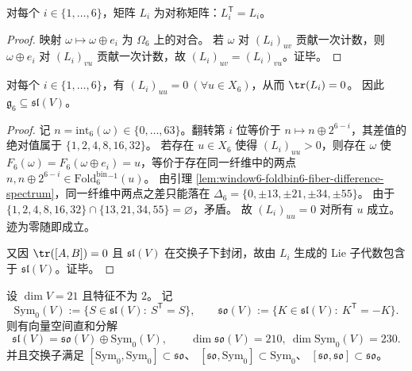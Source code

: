 \begin{lemma}[对称性]\label{lem:window6-li-symmetric}
对每个 \(i\in\{1,\dots,6\}\)，矩阵 \(L_i\) 为对称矩阵：\(L_i^{\mathsf T}=L_i\)。
\end{lemma}
\begin{proof}
映射 \(\omega\mapsto \omega\oplus e_i\) 为 \(\Omega_6\) 上的对合。
若 \(\omega\) 对 \((L_i)_{uv}\) 贡献一次计数，则 \(\omega\oplus e_i\) 对 \((L_i)_{vu}\) 贡献一次计数，故 \((L_i)_{uv}=(L_i)_{vu}\)。证毕。
\end{proof}

\begin{lemma}[零对角与迹零]\label{lem:window6-li-traceless}
对每个 \(i\in\{1,\dots,6\}\)，有 \((L_i)_{uu}=0\ (\forall u\in X_6)\)，从而 \(\tr(L_i)=0\)。
因此 \(\mathfrak{g}_6\subseteq \mathfrak{sl}(V)\)。
\end{lemma}
\begin{proof}
记 \(n=\mathrm{int}_6(\omega)\in\{0,\dots,63\}\)。翻转第 \(i\) 位等价于 \(n\mapsto n\oplus 2^{6-i}\)，其差值的绝对值属于 \(\{1,2,4,8,16,32\}\)。
若存在 \(u\in X_6\) 使得 \((L_i)_{uu}>0\)，则存在 \(\omega\) 使 \(F_6(\omega)=F_6(\omega\oplus e_i)=u\)，等价于存在同一纤维中的两点 \(n,n\oplus 2^{6-i}\in \mathrm{Fold}^{\mathrm{bin}}_6{}^{-1}(u)\)。
由引理 \ref{lem:window6-foldbin6-fiber-difference-spectrum}，同一纤维中两点之差只能落在 \(\Delta_6=\{0,\pm 13,\pm 21,\pm 34,\pm 55\}\)。
由于 \(\{1,2,4,8,16,32\}\cap\{13,21,34,55\}=\varnothing\)，矛盾。
故 \((L_i)_{uu}=0\) 对所有 \(u\) 成立。
迹为零随即成立。\par
又因 \(\tr([A,B])=0\) 且 \(\mathfrak{sl}(V)\) 在交换子下封闭，故由 \(L_i\) 生成的 Lie 子代数包含于 \(\mathfrak{sl}(V)\)。证毕。
\end{proof}

\begin{remark}[对称/反对称分解与交换子闭合]\label{rem:window6-sl-decomposition-so-sym0}
设 \(\dim V=21\) 且特征不为 \(2\)。
记
\[
\mathrm{Sym}_0(V):=\{S\in\mathfrak{sl}(V):\ S^{\mathsf T}=S\},
\qquad
\mathfrak{so}(V):=\{K\in\mathfrak{sl}(V):\ K^{\mathsf T}=-K\}.
\]
则有向量空间直和分解
\[
\mathfrak{sl}(V)=\mathfrak{so}(V)\oplus \mathrm{Sym}_0(V),
\qquad
\dim\mathfrak{so}(V)=210,\ \dim \mathrm{Sym}_0(V)=230.
\]
并且交换子满足
\(
[\mathrm{Sym}_0,\mathrm{Sym}_0]\subset \mathfrak{so}
\)、
\(
[\mathfrak{so},\mathrm{Sym}_0]\subset \mathrm{Sym}_0
\)、
\(
[\mathfrak{so},\mathfrak{so}]\subset \mathfrak{so}
\)。
\end{remark}

